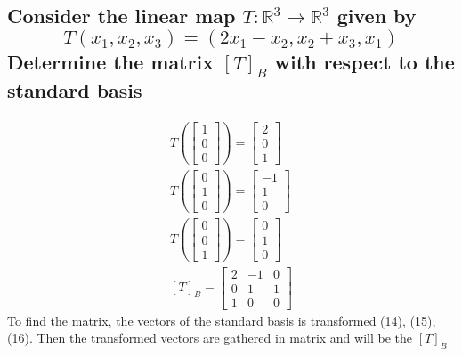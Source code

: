 \documentclass[12pt, a4paper]{article}
\begin{document}
		\subsection{Consider the linear map $T:\mathbb{R}^3\rightarrow \mathbb{R}^3$ given by $$T(x_1,x_2,x_3)=(2x_1-x_2,x_2+x_3,x_1)$$ Determine the matrix $[T]_B$ with respect to the standard basis}
			\begin{align}
				T\left(\begin{bmatrix}1\\0\\0\end{bmatrix}\right)=\begin{bmatrix}2\\0\\1\end{bmatrix}\\
				T\left(\begin{bmatrix}0\\1\\0\end{bmatrix}\right)=\begin{bmatrix}-1\\1\\0\end{bmatrix}\\
				T\left(\begin{bmatrix}0\\0\\1\end{bmatrix}\right)=\begin{bmatrix}0\\1\\0\end{bmatrix}\\
				[T]_B=\begin{bmatrix}2&-1&0\\0&1&1\\1&0&0\end{bmatrix}
			\end{align}
			To find the matrix, the vectors of the standard basis is transformed (14), (15), (16). Then the transformed vectors are gathered in matrix and will be the $[T]_B$
\end{document}

